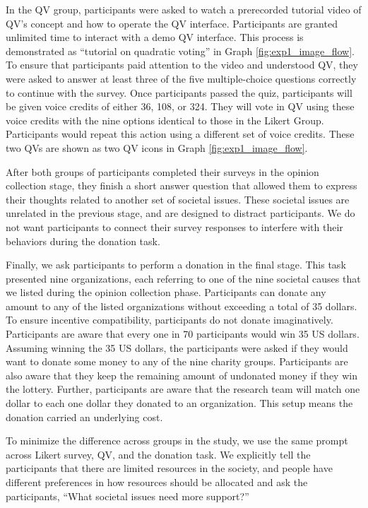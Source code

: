 In the QV group, 
participants were asked to watch 
a prerecorded tutorial video of QV's concept 
and how to operate the QV interface.
Participants are granted unlimited time 
to interact with a demo QV interface. 
This process is demonstrated as 
``tutorial on quadratic voting'' 
in Graph \ref{fig:exp1_image_flow}.
To ensure that participants paid attention to the video and understood QV, 
they were asked to answer at least three of the five multiple-choice questions 
correctly to continue with the survey.
Once participants passed the quiz, 
participants will be given voice credits of either 36, 108, or 324.
They will vote in QV using these voice credits 
with the nine options identical to those in the Likert Group.
Participants would repeat this action using a different set of voice credits.
These two QVs are shown as two QV icons in Graph \ref{fig:exp1_image_flow}.



After both groups of participants completed their surveys in the opinion collection stage, 
they finish a short answer question
that allowed them to express their thoughts 
related to another set of societal issues.
These societal issues are unrelated in the previous stage,
and are designed to distract participants.
We do not want participants to connect their survey responses
to interfere with their behaviors during the donation task.

Finally, 
we ask participants to perform a donation in the final stage.
This task presented nine organizations,
each referring to one of the nine societal causes
that we listed during the opinion collection phase.
Participants can donate 
any amount to any of the listed organizations
without exceeding a total of 35 dollars.
To ensure incentive compatibility, 
participants do not donate imaginatively.
Participants are aware that every one in 70 participants would win 35 US dollars.
Assuming winning the 35 US dollars, 
the participants were asked 
if they would want to donate some money 
to any of the nine charity groups.
Participants are also aware that 
they keep the remaining amount of undonated money 
if they win the lottery.
Further, participants are aware that 
the research team will match one dollar to each one dollar 
they donated to an organization.
This setup means the donation carried an underlying cost.

To minimize the difference across groups in the study, 
we use the same prompt across Likert survey, QV, and the donation task.
We explicitly tell the participants that 
there are limited resources in the society, 
and people have different preferences 
in how resources should be allocated and ask the participants, 
``What societal issues need more support?''

